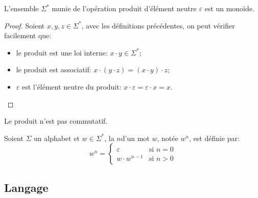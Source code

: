 \begin{proposition}
    L'ensemble \( \Sigma^* \) munie de l'opération produit d'élément neutre \( \varepsilon \) est un monoïde.
\end{proposition}

\begin{proof}
    Soient \( x, y, z \in \Sigma^* \), avec les définitions précédentes, on peut vérifier facilement que:
    \begin{itemize}
    \item
      le produit est une loi interne: $x \cdot y \in \Sigma^*$;
    \item
      le produit est associatif: $x \cdot (y \cdot z) = (x \cdot y) \cdot z$;
    \item
      $\varepsilon$ est l'élément neutre du produit: $x \cdot \varepsilon = \varepsilon \cdot x = x$.
    \end{itemize}
\end{proof}

Le produit n'est pas commutatif.


\begin{definition}
    Soient \( \Sigma \) un alphabet et \( w \in \Sigma^* \), la  \( n \)\ieme d'un mot \( w \), notée \( w^n \), est définie par:
    \[
    w^n =
    \begin{cases}
        \varepsilon     & \text{si $n = 0$} \\
        w \cdot w^{n-1} & \text{si $n > 0$}
    \end{cases}
    \]
\end{definition}


\subsection{Langage}

